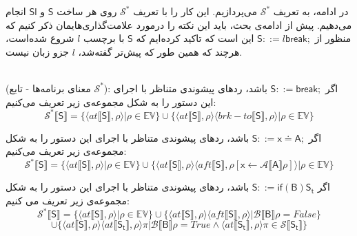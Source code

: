 در ادامه، به تعریف $\mathcal{S^*}$ می‌پردازیم. این کار را با تعریف $\mathcal{S^*}$ روی هر ساخت $\mathsf{S}$ و $\mathsf{Sl}$ انجام می‌دهیم.
پیش از ادامه‌ی بحث، باید این نکته را در‌مورد علامت‌گذاری‌هایمان ذکر کنیم که منظور از $        \mathsf{S} ::= l \mathsf{break;}  $ این است که تاکید کرده‌ایم که $\mathsf{S}$ با برچسب $l$ شروع شده‌است، هرچند که همین طور که پیش‌تر گفته‌شد،   $l$ جزو زبان نیست.\\\\

\begin{defn}
	(معنای برنامه‌ها - تابع $\mathcal{S}^*$): 
	اگر $        \mathsf{S} ::= \mathsf{break;}  $ باشد، ردهای پیشوندی متناظر با اجرای این دستور را به شکل مجموعه‌ی زیر تعریف می‌کنیم:
	$$\mathcal{S^*} \llbracket\mathsf{S}\rrbracket = \{ \langle at\llbracket\mathsf{S}\rrbracket , \rho \rangle | \rho \in \mathbb{EV}       \} \cup     \{ \langle at\llbracket\mathsf{S}\rrbracket , \rho \rangle \langle brk-to\llbracket\mathsf{S}\rrbracket , \rho \rangle | \rho \in \mathbb{EV}       \}             $$   
	
	
	اگر $        \mathsf{S} ::=  \mathsf{x\doteq A;}  $ باشد، ردهای پیشوندی متناظر با اجرای این دستور را به شکل مجموعه‌ی زیر تعریف می‌کنیم:
	$$\mathcal{S^*} \llbracket\mathsf{S}\rrbracket = \{ \langle at\llbracket\mathsf{S}\rrbracket , \rho \rangle | \rho \in \mathbb{EV}       \} \cup     \{ \langle at\llbracket\mathsf{S}\rrbracket , \rho \rangle \langle aft\llbracket\mathsf{S}\rrbracket , \rho[\mathsf{x}\leftarrow \mathcal{A}\llbracket\mathsf{A}\rrbracket\rho] \rangle | \rho \in \mathbb{EV}       \}             $$   
	
	اگر $         \mathsf{S} ::= \mathsf{if}  \mathsf{ (B) S_t}  $ باشد، ردهای پیشوندی متناظر با اجرای این دستور را به شکل مجموعه‌ی زیر تعریف می کنیم:
	$$\mathcal{S^*} \llbracket\mathsf{S}\rrbracket = \{ \langle at\llbracket\mathsf{S}\rrbracket , \rho \rangle | \rho \in \mathbb{EV}       \} \cup     \{ \langle at\llbracket\mathsf{S}\rrbracket , \rho \rangle \langle aft\llbracket\mathsf{S}\rrbracket , \rho \rangle | \mathcal{B}\llbracket\mathsf{B}\rrbracket \rho =False      \} 
	$$$$\cup    \{ \langle at\llbracket\mathsf{S}\rrbracket , \rho \rangle \langle at\llbracket\mathsf{S_t}\rrbracket , \rho \rangle 
	\pi | \mathcal{B}\llbracket\mathsf{B}\rrbracket \rho =True  \wedge   \langle  at\llbracket\mathsf{S_t}\rrbracket  , \rho \rangle \pi \in \mathcal{S} \llbracket\mathsf{S_t}\rrbracket    \}          $$ 
	

\end{defn}
